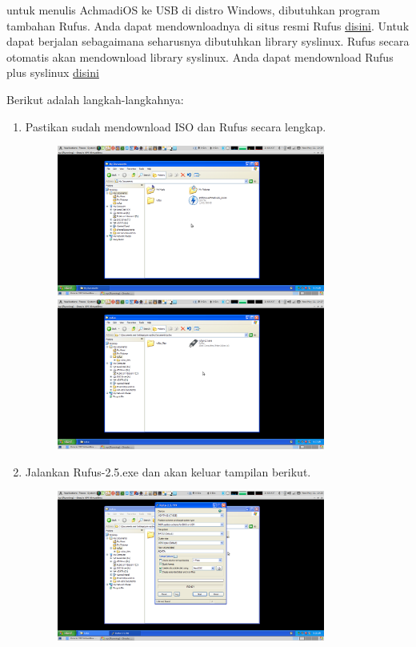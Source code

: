 \documentclass[12pt,]{article}
\begin{document}
	untuk menulis AchmadiOS ke USB di distro Windows, dibutuhkan program tambahan Rufus.
	Anda dapat mendownloadnya di situs resmi Rufus \href{https://rufus.akeo.ie/}{disini}.
	Untuk dapat berjalan sebagaimana seharusnya dibutuhkan library syslinux.
	Rufus secara otomatis akan mendownload library syslinux.
	Anda dapat mendownload Rufus plus syslinux \href{http://www.mediafire.com/download/5gdb8z98zg8sgxj/rufus.zip}{disini} 
	
	Berikut adalah langkah-langkahnya:
	\begin{enumerate}
		\item Pastikan sudah mendownload ISO dan Rufus secara lengkap.
		\begin{figure}[!ht]
			\centering
			\includegraphics[width=250pt]{usbwin/step_1}
			\includegraphics[width=250pt]{usbwin/step_2}
		\end{figure}
	
		\item Jalankan Rufus-2.5.exe dan akan keluar tampilan berikut.
		\begin{figure}[!ht]
			\centering
			\includegraphics[width=250pt]{usbwin/step_3}
		\end{figure}
	

\end{enumerate}
\end{document}
